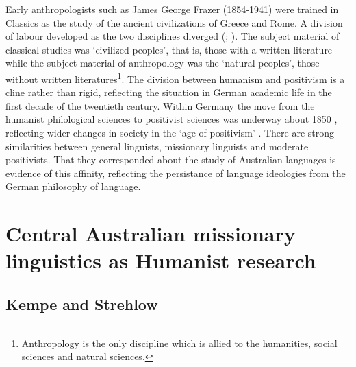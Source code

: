 \documentclass[output=paper]{langsci/langscibook}
\begin{document}
Early anthropologists such as James George Frazer (1854-1941) were trained in Classics as the study of the ancient civilizations of Greece and Rome. A division of labour developed as the two disciplines diverged (\citealt{marett_anthropology_1908}; \citealt{kluckhohn_anthropology_1961}). The subject material of classical studies was ‘civilized peoples’, that is, those with a written literature while the subject material of anthropology was the ‘natural peoples’, those without written literatures\footnote{ \textrm{Anthropology is the only discipline which is allied to the humanities, social sciences and natural sciences.} }. The division between humanism and positivism is a cline rather than rigid, reflecting the situation in German academic life in the first decade of the twentieth century. Within Germany the move from the humanist philological sciences to positivist sciences was underway about 1850 \citep[26]{smith_politics_1991}, reflecting wider changes in society in the ‘age of positivism’ \citep[120]{stocking_virchow_1996}. There are strong similarities between general linguists, missionary linguists and moderate positivists. That they corresponded about the study of Australian languages is evidence of this affinity, reflecting the persistance of language ideologies from the German philosophy of language.
 
\section{Central Australian missionary linguistics as Humanist research}

\subsection{Kempe and Strehlow}
\end{document}
